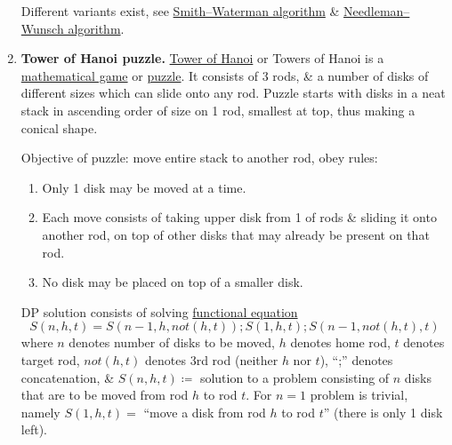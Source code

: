 \documentclass{article}
\begin{document}
\begin{enumerate}
	Different variants exist, see \href{https://en.wikipedia.org/wiki/Smith%E2%80%93Waterman_algorithm}{Smith--Waterman algorithm} \& \href{https://en.wikipedia.org/wiki/Needleman%E2%80%93Wunsch_algorithm}{Needleman--Wunsch algorithm}.
	\item {\bf Tower of Hanoi puzzle.} \href{https://en.wikipedia.org/wiki/Tower_of_Hanoi}{Tower of Hanoi} or Towers of Hanoi is a \href{https://en.wikipedia.org/wiki/Mathematical_game}{mathematical game} or \href{https://en.wikipedia.org/wiki/Puzzle}{puzzle}. It consists of 3 rods, \& a number of disks of different sizes which can slide onto any rod. Puzzle starts with disks in a neat stack in ascending order of size on 1 rod, smallest at top, thus making a conical shape.

	Objective of puzzle: move entire stack to another rod, obey rules:
	\begin{enumerate}
		\item Only 1 disk may be moved at a time.
		\item Each move consists of taking upper disk from 1 of rods \& sliding it onto another rod, on top of other disks that may already be present on that rod.
		\item No disk may be placed on top of a smaller disk.
	\end{enumerate}
	DP solution consists of solving \href{https://en.wikipedia.org/wiki/Bellman_equation}{functional equation}
	\begin{equation*}
		S(n,h,t) = S(n - 1,h,not(h,t));S(1,h,t);S(n - 1,not(h,t),t)
	\end{equation*}
	where $n$ denotes number of disks to be moved, $h$ denotes home rod, $t$ denotes target rod, $not(h,t)$ denotes 3rd rod (neither $h$ nor $t$), ``;'' denotes concatenation, \& $S(n,h,t)\coloneqq$ solution to a problem consisting of $n$ disks that are to be moved from rod $h$ to rod $t$. For $n = 1$ problem is trivial, namely $S(1,h,t) =$ ``move a disk from rod $h$ to rod $t$'' (there is only 1 disk left).


\end{enumerate}
\end{document}
